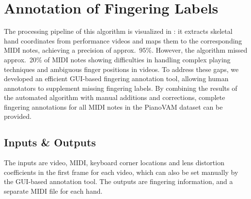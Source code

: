 \documentclass{article}
\begin{document}


\section{Annotation of Fingering Labels}\label{sec:fingering_detection}
The processing pipeline of this algorithm is visualized in : it extracts skeletal hand coordinates from performance videos and maps them to the corresponding MIDI notes, achieving a precision of approx.\ 95\%. However, the algorithm missed approx.\ 20\% of MIDI notes showing difficulties in handling complex playing techniques and ambiguous finger positions in videos. To address these gaps, we developed an efficient GUI-based fingering annotation tool, allowing human annotators to supplement missing fingering labels. By combining the results of the automated algorithm with manual additions and corrections, complete fingering annotations for all MIDI notes in the PianoVAM dataset can be provided.

\subsection{Inputs \& Outputs}
The inputs are video, MIDI, keyboard corner locations and lens distortion coefficients in the first frame for each video, which can also be set manually by the GUI-based annotation tool.
The outputs are fingering information, and a separate MIDI file  for each hand.
\end{document}

